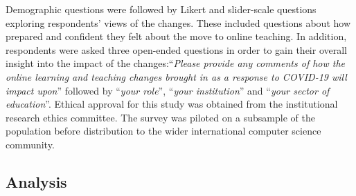 \documentclass[sigconf]{acmart}
\begin{document}

Demographic questions were followed by Likert and slider-scale
questions exploring respondents' views of the changes. These included
questions about how prepared and confident they felt about the move to
online teaching. In addition, respondents were asked three open-ended
questions in order to gain their overall insight into the impact of
the changes:``{\emph{Please provide any comments of how the online
learning and teaching changes brought in as a response to COVID-19
will impact upon}}'' followed by ``{\emph{your role}}'', ``{\emph{your
institution}}'' and ``{\emph{your sector of education}}''. Ethical
approval for this study was obtained from the institutional research
ethics committee. The survey was piloted on a subsample of the
population before distribution to the wider international computer science
community.


\subsection{Analysis}

\end{document}
